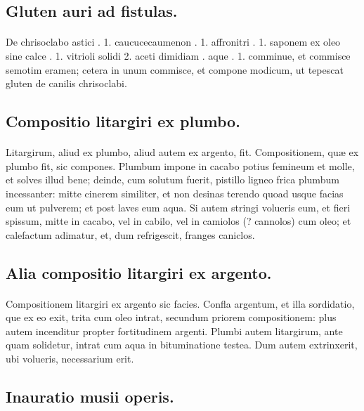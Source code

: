 \documentclass[a4paper, 11pt, oneside, polutonikogreek, italian]{article}
\begin{document}
\subsection{Gluten auri ad fistulas.}
\paragraph{}
De chrisoclabo astici \roundz. 1. caucucecaumenon \roundz. 1. affronitri \roundz. 1. saponem ex oleo sine calce \roundz. 1. vitrioli solidi 2. aceti dimidiam \roundz. aque \roundz. 1. comminue, et commisce semotim eramen; cetera in unum commisce, et compone modicum, ut tepescat gluten de canilis chrisoclabi.

\subsection{Compositio litargiri ex plumbo.}
\paragraph{}
Litargirum, aliud ex plumbo, aliud autem ex argento, fit. Compositionem, quæ ex plumbo fit, sic compones. Plumbum impone in cacabo potius femineum et molle, et solves illud bene; deinde, cum solutum fuerit, pistillo ligneo frica plumbum incessanter: mitte cinerem similiter, et non desinas terendo quoad usque facias eum ut pulverem; et post laves eum aqua. Si autem stringi volueris eum, et fieri spissum, mitte in cacabo, vel in cabilo, vel in camiolos (? cannolos) cum oleo; et calefactum adimatur, et, dum refrigescit, franges caniclos.

\subsection{Alia compositio litargiri ex argento.}
\paragraph{}
Compositionem litargiri ex argento sic facies. Confla argentum, et illa sordidatio, que ex eo exit, trita cum oleo intrat, secundum priorem compositionem: plus autem incenditur propter fortitudinem argenti. Plumbi autem litargirum, ante quam solidetur, intrat cum aqua in bituminatione testea. Dum autem extrinxerit, ubi volueris, necessarium erit.

\subsection{Inauratio musii operis.}
\end{document}
